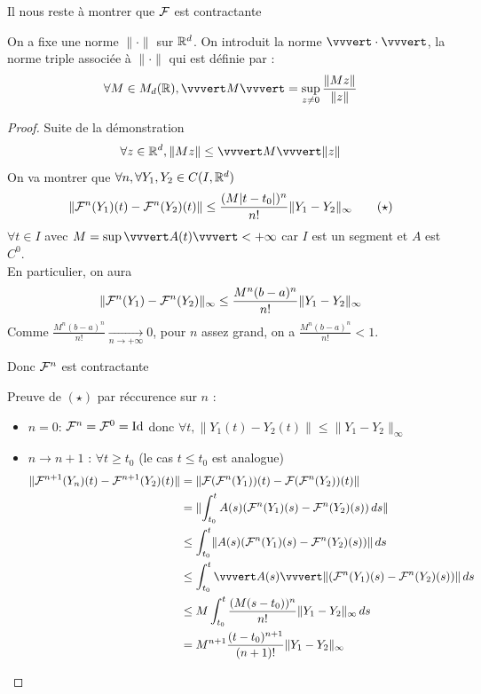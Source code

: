\documentclass[]{report}
\begin{document}
Il nous reste à montrer que $\mathcal{F}$ est contractante

\begin{re}{}{}
    On a fixe une norme $\lVert\cdot \rVert$ sur $\mathbb{R}^d$. On introduit la norme $\vvvert\cdot\vvvert$, la norme triple associée à $\lVert\cdot\rVert$ qui est définie par :
    \[\forall M\in M_d(\R),\vvvert M \vvvert=\sup_{z\neq 0} \frac{\lVert M z\rVert}{\lVert z \rVert}\]
\end{re}

\begin{proof}{Suite de la démonstration}{}
    \[\forall z\in \R^d,\lVert Mz\rVert\le\vvvert M\vvvert \lVert z \rVert\]
    On va montrer que $\forall n,\forall Y_1,Y_2\in C(I,\mathbb{R}^d)$
    \[\lVert\mathcal{F}^n(Y_1)(t)-\mathcal{F}^n(Y_2)(t)\rVert\le \frac{(M|t-t_0|)^n}{n!}\lVert Y_1-Y_2\rVert_{\infty} \qquad (\star)\]
    $\forall t\in I$ avec $M=\sup \vvvert A(t) \vvvert <+\infty$ car $I$ est un segment et $A$ est $C^0$.\\
    En particulier, on aura
    \[\lVert \mathcal{F}^n(Y_1)-\mathcal{F}^n(Y_2)\rVert_\infty\le \frac{M^n(b-a)^n}{n!}\lVert Y_1-Y_2\rVert_\infty\]
    Comme $\displaystyle{\frac{M^n(b-a)^n}{n!}\xrightarrow[n\to+\infty]{}0}$, pour $n$ assez grand, on a $\frac{M^n(b-a)^n}{n!}<1$.
    \begin{center}
        Donc $\mathcal{F}^n$ est contractante
    \end{center}
    Preuve de $(\star)$ par réccurence sur $n$ :\\
    \begin{itemize}
        \item $n=0$: $\mathcal{F}^n=\mathcal{F}^0=\text{Id}$ donc $\forall t,\lVert Y_1(t)-Y_2(t)\rVert\le \lVert Y_1-Y_2\rVert_\infty$
        \item $n\to n+1$ : $\forall t\ge t_0$ (le cas $t\le t_0$ est analogue)
        \begin{align*}\lVert \Fr^{n+1}(Y_n)(t) -\Fr^{n+1}(Y_2)(t) \rVert&=\lVert \Fr(\Fr^n(Y_1))(t)-\Fr(\Fr^n(Y_2))(t) \rVert\\
            &=\lVert \int_{t_0}^t A(s)(\Fr^n(Y_1)(s)-\Fr^n(Y_2)(s))\,ds \rVert\\
            &\le \int_{t_0}^t \lVert A(s)(\Fr^n(Y_1)(s)-\Fr^n(Y_2)(s)) \rVert \,ds\\
            &\le \int_{t_0}^t \vvvert A(s)\vvvert \lVert(\Fr^n(Y_1)(s)-\Fr^n(Y_2)(s)) \rVert \,ds\\
            &\le M \int_{t_0}^t \frac{(M(s-t_0))^n}{n!}\lVert Y_1-Y_2\rVert_\infty\,ds\\
            &=M^{n+1} \frac{(t-t_0)^{n+1}}{(n+1)!}\lVert Y_1-Y_2 \rVert_\infty
        \end{align*}
    \end{itemize}
\end{proof}
\end{document}
